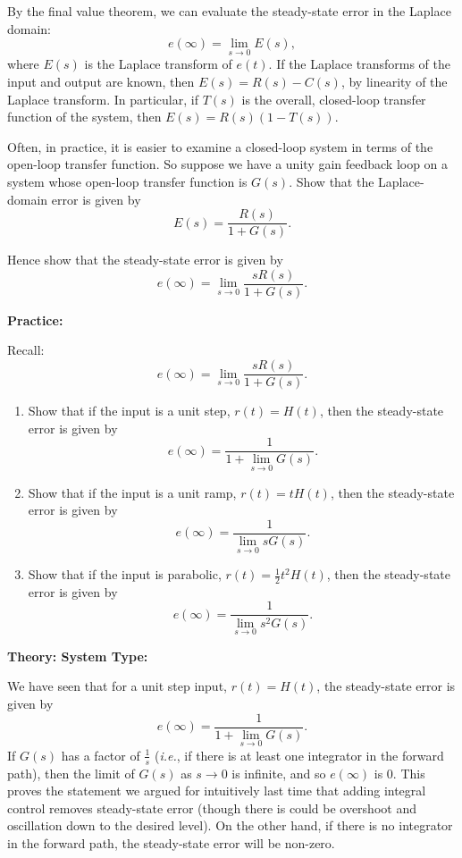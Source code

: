 \documentclass{article}
\begin{document}
By the final value theorem, we can evaluate the steady-state error in the Laplace domain:
\[e(\infty) = \lim_{s\to 0} E(s),\]
where $E(s)$ is the Laplace transform of $e(t)$. If the Laplace transforms of the input and output are known, then $E(s)=R(s)-C(s)$, by linearity of the Laplace transform. In particular, if $T(s)$ is the overall, closed-loop transfer function of the system, then $E(s)=R(s)(1-T(s))$.\bigskip


Often, in practice, it is easier to examine a closed-loop system in terms of the open-loop transfer function. So suppose we have a unity gain feedback loop on a system whose open-loop transfer function is $G(s)$. Show that the Laplace-domain error is given by
\[E(s)=\frac{R(s)}{1+G(s)}.\]

\vfill


Hence show that the steady-state error is given by
\[e(\infty) = \lim_{s\to 0} \frac{sR(s)}{1+G(s)}.\]


\clearpage



\textbf{Practice:}\bigskip

Recall:
\[e(\infty) = \lim_{s\to 0} \frac{sR(s)}{1+G(s)}.\]

\begin{enumerate}
	\item Show that if the input is a unit step, $r(t)=H(t)$, then the steady-state error is given by
		\[e(\infty) = \frac{1}{1+\lim\limits_{s\to 0}G(s)}.\]
	\item Show that if the input is a unit ramp, $r(t)=tH(t)$, then the steady-state error is given by
		\[e(\infty) = \frac{1}{\lim\limits_{s\to 0} sG(s)}.\]
	\item Show that if the input is parabolic, $r(t)=\frac{1}{2}t^2H(t)$, then the steady-state error is given by
		\[e(\infty) = \frac{1}{\lim\limits_{s\to 0} s^2G(s)}.\]
\end{enumerate}



\clearpage



\textbf{Theory: System Type:}\bigskip

We have seen that for a unit step input, $r(t)=H(t)$, the steady-state error is given by
\[e(\infty)=\frac{1}{1+\lim\limits_{s\to 0} G(s)}.\]
If $G(s)$ has a factor of $\frac{1}{s}$ (\textit{i.e.}, if there is at least one integrator in the forward path), then the limit of $G(s)$ as $s\to 0$ is infinite, and so $e(\infty)$ is 0. This proves the statement we argued for intuitively last time that adding integral control removes steady-state error (though there is could be overshoot and oscillation down to the desired level). On the other hand, if there is no integrator in the forward path, the steady-state error will be non-zero.\medskip
\end{document}
